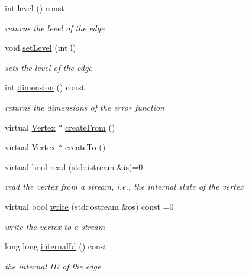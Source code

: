 \begin{DoxyCompactItemize}
\item 
int \hyperlink{classg2o_1_1OptimizableGraph_1_1Edge_af92bd1589a99fa9732a5f2964cf38a6c}{level} () const 
\begin{DoxyCompactList}\small\item\em returns the level of the edge \end{DoxyCompactList}\item 
void \hyperlink{classg2o_1_1OptimizableGraph_1_1Edge_ab3e4290bc51d03ba294f36254048b15a}{set\+Level} (int l)
\begin{DoxyCompactList}\small\item\em sets the level of the edge \end{DoxyCompactList}\item 
int \hyperlink{classg2o_1_1OptimizableGraph_1_1Edge_a90a86891adc47a179a7cd7ef31549916}{dimension} () const 
\begin{DoxyCompactList}\small\item\em returns the dimensions of the error function \end{DoxyCompactList}\item 
virtual \hyperlink{classg2o_1_1OptimizableGraph_1_1Vertex}{Vertex} $\ast$ \hyperlink{classg2o_1_1OptimizableGraph_1_1Edge_abd98d7a174df25bcc82cfdacba682fec}{create\+From} ()
\item 
virtual \hyperlink{classg2o_1_1OptimizableGraph_1_1Vertex}{Vertex} $\ast$ \hyperlink{classg2o_1_1OptimizableGraph_1_1Edge_a39c22b396ab312059ea8fa4c2776be2e}{create\+To} ()
\item 
virtual bool \hyperlink{classg2o_1_1OptimizableGraph_1_1Edge_a30cf69b762a06aa35e796d8af71632b0}{read} (std\+::istream \&is)=0
\begin{DoxyCompactList}\small\item\em read the vertex from a stream, i.\+e., the internal state of the vertex \end{DoxyCompactList}\item 
virtual bool \hyperlink{classg2o_1_1OptimizableGraph_1_1Edge_a804b9a2178249b9297c55b8fbbeda56e}{write} (std\+::ostream \&os) const =0
\begin{DoxyCompactList}\small\item\em write the vertex to a stream \end{DoxyCompactList}\item 
long long \hyperlink{classg2o_1_1OptimizableGraph_1_1Edge_ac4ab4bc451232a7ff4dca8484181fcad}{internal\+Id} () const 
\begin{DoxyCompactList}\small\item\em the internal ID of the edge \end{DoxyCompactList}\item 

\end{DoxyCompactItemize}
